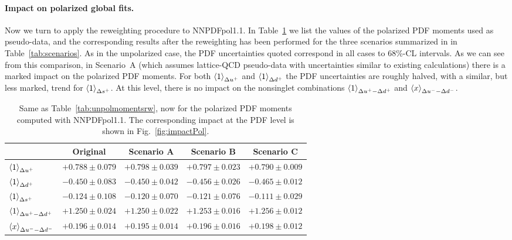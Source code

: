\paragraph{Impact on polarized global fits.}
%
Now we turn to apply the reweighting procedure to NNPDFpol1.1.
%
In Table~\ref{tab:polmomentsrw}
we list the values of the polarized PDF moments
used as pseudo-data, and the corresponding results
after the reweighting has been performed for the
three scenarios summarized in 
in Table~\ref{tab:scenarios}.
%
As in the unpolarized case, the PDF uncertainties quoted correspond in 
all cases to 68\%-CL intervals.
%
As we can see from this comparison, in Scenario~A
(which assumes lattice-QCD pseudo-data with uncertainties similar
to existing calculations) there is a marked impact on the
polarized PDF moments.
%
For both $\left\langle 1\right\rangle_{\Delta u^+}$ and $\left\langle 1\right\rangle_{\Delta d^+}$
the PDF uncertainties are roughly halved, with a similar, but less marked,
trend for $\left\langle 1\right\rangle_{\Delta s^+}$.
%
At this level, there is no impact on the nonsinglet
combinations $\left\langle 1\right\rangle_{\Delta u^+ - \Delta d^+}$
and $\left\langle x\right\rangle_{\Delta u^--\Delta d^-}$.

\begin{table}[!t]
\centering
\footnotesize
\renewcommand{\arraystretch}{1.4} 
\begin{tabular}{lcccc}
\toprule
& Original & Scenario A &  Scenario B & Scenario C \\
\midrule
$\left\langle 1\right\rangle_{\Delta u^+}$    
& $+0.788 \pm 0.079$   
& $+0.798 \pm 0.039$     
& $+0.797 \pm 0.023$ 
& $+0.790 \pm 0.009$ \\
$\left\langle 1\right\rangle_{\Delta d^+}$   
& $-0.450 \pm 0.083$  
& $-0.450 \pm 0.042$  
& $-0.456 \pm 0.026$    
& $-0.465 \pm 0.012$ \\
$\left\langle 1\right\rangle_{\Delta s^+}$    
& $-0.124 \pm 0.108$  
& $-0.120 \pm 0.070$  
& $-0.121 \pm 0.076$    
& $-0.111 \pm 0.029$ \\
$\left\langle 1\right\rangle_{\Delta u^+ - \Delta d^+}$  
& $+1.250 \pm 0.024$   
& $+1.250 \pm 0.022$  
& $+1.253 \pm 0.016$ 
& $+1.256 \pm 0.012$ \\
$\left\langle x\right\rangle_{\Delta u^--\Delta d^-}$     
& $+0.196 \pm 0.014$    
& $+0.195 \pm 0.014$
& $+0.196 \pm 0.016$     
& $+0.198 \pm 0.012$ \\
\bottomrule
\end{tabular}
\caption{\small Same as Table~\ref{tab:unpolmomentsrw}, now for
  the polarized PDF moments computed with NNPDFpol1.1.
  The corresponding impact at the PDF level is shown in
  Fig.~\ref{fig:impactPol}.
\label{tab:polmomentsrw}
}
\end{table}

